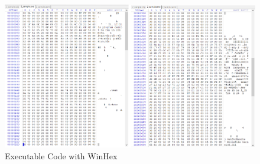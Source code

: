 \documentclass[11pt]{article}
\begin{document}
\begin{figure}[h!]
        \centering
        \includegraphics[width=17cm]{WinHexExe.png}
        \caption{Executable Code with WinHex}
        \label{fig:WinHexExe}
\end{figure}

\clearpage
\newpage
\end{document}
